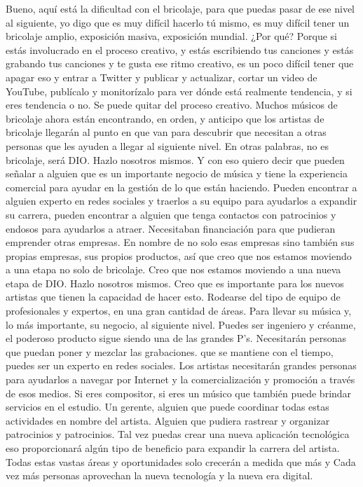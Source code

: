\documentclass[10pt]{book}
\begin{document}
Bueno, aquí está la dificultad con el bricolaje, para que puedas pasar de ese nivel al siguiente, yo digo que es muy difícil hacerlo tú mismo, es muy difícil tener un bricolaje amplio, exposición masiva, exposición mundial. ¿Por qué? Porque si estás involucrado en el proceso creativo, y estás escribiendo tus canciones y estás grabando tus canciones y te gusta ese ritmo creativo, es un poco difícil tener que apagar eso y entrar a Twitter y publicar y actualizar, cortar un video de YouTube, publícalo y monitorízalo para ver dónde está realmente tendencia, y si eres tendencia o no. Se puede quitar del proceso creativo. Muchos músicos de bricolaje ahora están encontrando, en orden, y anticipo que los artistas de bricolaje llegarán al punto en que van para descubrir que necesitan a otras personas que les ayuden a llegar al siguiente nivel. En otras palabras, no es bricolaje, será DIO. Hazlo nosotros mismos. Y con eso quiero decir que pueden señalar a alguien que es un importante negocio de música y tiene la experiencia comercial para ayudar en la gestión de lo que están haciendo. Pueden encontrar a alguien experto en redes sociales y traerlos a su equipo para ayudarlos a expandir su carrera, pueden encontrar a alguien que tenga contactos con patrocinios y endosos para ayudarlos a atraer. Necesitaban financiación para que pudieran emprender otras empresas. En nombre de no solo esas empresas sino también sus propias empresas, sus propios productos, así que creo que nos estamos moviendo a una etapa no solo de bricolaje. Creo que nos estamos moviendo a una nueva etapa de DIO. Hazlo nosotros mismos. Creo que es importante para los nuevos artistas que tienen la capacidad de hacer esto. Rodearse del tipo de equipo de profesionales y expertos, en una gran cantidad de áreas. Para llevar su música y, lo más importante, su negocio, al siguiente nivel. Puedes ser ingeniero y créanme, el poderoso producto sigue siendo una de las grandes P's. Necesitarán personas que puedan poner y mezclar las grabaciones. que se mantiene con el tiempo, puedes ser un experto en redes sociales.  Los artistas necesitarán grandes personas para ayudarlos a navegar por Internet y la comercialización y promoción a través de esos medios. Si eres compositor, si eres un músico que también puede brindar servicios en el estudio. Un gerente, alguien que puede coordinar todas estas actividades en nombre del artista. Alguien que pudiera rastrear y organizar patrocinios y patrocinios. Tal vez puedas crear una nueva aplicación tecnológica eso proporcionará algún tipo de beneficio para expandir la carrera del artista. Todas estas vastas áreas y oportunidades solo crecerán a medida que más y Cada vez más personas aprovechan la nueva tecnología y la nueva era digital.
\end{document}
